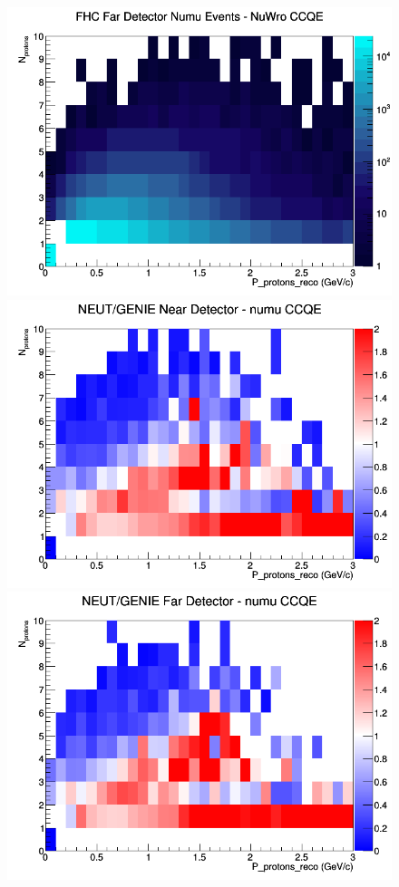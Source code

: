 \begin{figure}[h]
\endminipage
{}
\includegraphics[width=\linewidth]{eff_N_P/LAr/protons/CCQE_FHC_FD_numu_N_P_NuWro.png}
\endminipage
\newline
{}
\includegraphics[width=\linewidth]{eff_N_P/LAr/protons/ratios/CCQE_NEUT_GENIE_numu_near_N_P.png}
\endminipage
{}
\includegraphics[width=\linewidth]{eff_N_P/LAr/protons/ratios/CCQE_NEUT_GENIE_numu_far_N_P.png}

\end{figure}
